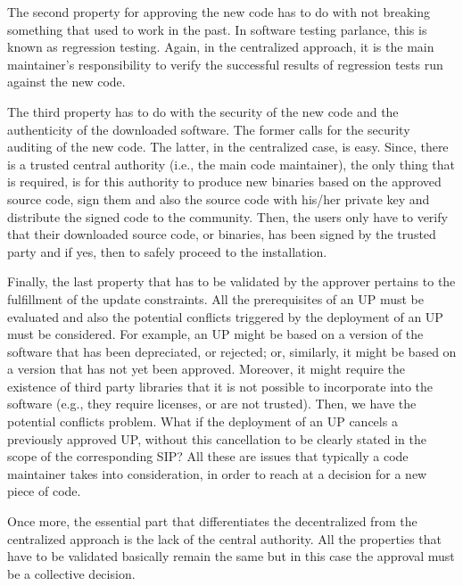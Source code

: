 The second property for approving the new code has to do with not breaking something that used to work in the past. In software testing parlance, this is known as regression testing. Again, in the centralized approach, it is the main maintainer's responsibility to verify the successful results of regression tests run against the new code. 

The third property has to do with the security of the new code and the authenticity of the downloaded software. The former calls for the security auditing of the new code. The latter, in the centralized case, is easy. Since, there is a trusted central authority (i.e., the main code maintainer), the only thing that is required, is for this authority to produce new binaries based on the approved source code, sign them and also the source code with his/her private key and distribute the signed code to the community. Then, the users only have to verify that their downloaded source code, or binaries, has been signed by the trusted party and if yes, then to safely proceed to the installation.

Finally, the last property that has to be validated by the approver pertains to the fulfillment of the update constraints. All the prerequisites of an UP must be evaluated and also the potential conflicts triggered by the deployment of an UP must be considered. For example, an UP might be based on a version of the software that has been depreciated, or rejected; or, similarly, it might be based on a version that has not yet been approved. Moreover, it might require the existence of third party libraries that it is not possible to incorporate into the software (e.g., they require licenses, or are not trusted). Then, we have the potential conflicts problem. What if the deployment of an UP cancels a previously approved UP, without this cancellation to be clearly stated in the scope of the corresponding SIP? All these are issues that typically a code maintainer takes into consideration, in order to reach at a decision for a new piece of code.

Once more, the essential part that differentiates the decentralized from the centralized approach is the lack of the central authority. All the properties that have to be validated basically remain the same but in this case the approval must be a collective decision.

